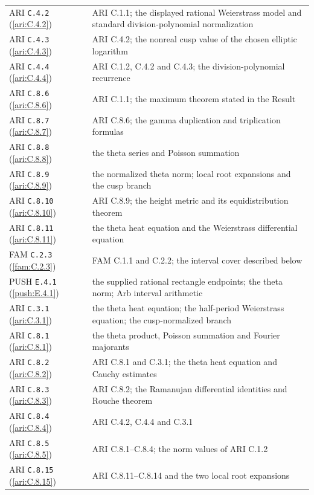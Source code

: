 \documentclass[11pt,a4paper]{article}
\theoremstyle{plain}
\theoremstyle{definition}
\begin{document}
\begin{longtable}{@{}L{.21\linewidth}L{.73\linewidth}@{}}
ARI \nolinkurl{C.4.2} (\ref{ari:C.4.2}) & ARI C.1.1; the displayed rational Weierstrass model and standard division-polynomial normalization\\
ARI \nolinkurl{C.4.3} (\ref{ari:C.4.3}) & ARI C.4.2; the nonreal cusp value of the chosen elliptic logarithm\\
ARI \nolinkurl{C.4.4} (\ref{ari:C.4.4}) & ARI C.1.2, C.4.2 and C.4.3; the division-polynomial recurrence\\
ARI \nolinkurl{C.8.6} (\ref{ari:C.8.6}) & ARI C.1.1; the maximum theorem stated in the Result\\
ARI \nolinkurl{C.8.7} (\ref{ari:C.8.7}) & ARI C.8.6; the gamma duplication and triplication formulas\\
ARI \nolinkurl{C.8.8} (\ref{ari:C.8.8}) & the theta series and Poisson summation\\
ARI \nolinkurl{C.8.9} (\ref{ari:C.8.9}) & the normalized theta norm; local root expansions and the cusp branch\\
ARI \nolinkurl{C.8.10} (\ref{ari:C.8.10}) & ARI C.8.9; the height metric and its equidistribution theorem\\
ARI \nolinkurl{C.8.11} (\ref{ari:C.8.11}) & the theta heat equation and the Weierstrass differential equation\\
FAM \nolinkurl{C.2.3} (\ref{fam:C.2.3}) & FAM C.1.1 and C.2.2; the interval cover described below\\
PUSH \nolinkurl{E.4.1} (\ref{push:E.4.1}) & the supplied rational rectangle endpoints; the theta norm; Arb interval arithmetic\\
ARI \nolinkurl{C.3.1} (\ref{ari:C.3.1}) & the theta heat equation; the half-period Weierstrass equation; the cusp-normalized branch\\
ARI \nolinkurl{C.8.1} (\ref{ari:C.8.1}) & the theta product, Poisson summation and Fourier majorants\\
ARI \nolinkurl{C.8.2} (\ref{ari:C.8.2}) & ARI C.8.1 and C.3.1; the theta heat equation and Cauchy estimates\\
ARI \nolinkurl{C.8.3} (\ref{ari:C.8.3}) & ARI C.8.2; the Ramanujan differential identities and Rouche theorem\\
ARI \nolinkurl{C.8.4} (\ref{ari:C.8.4}) & ARI C.4.2, C.4.4 and C.3.1\\
ARI \nolinkurl{C.8.5} (\ref{ari:C.8.5}) & ARI C.8.1--C.8.4; the norm values of ARI C.1.2\\
ARI \nolinkurl{C.8.15} (\ref{ari:C.8.15}) & ARI C.8.11--C.8.14 and the two local root expansions\\

\end{longtable}
\end{document}
